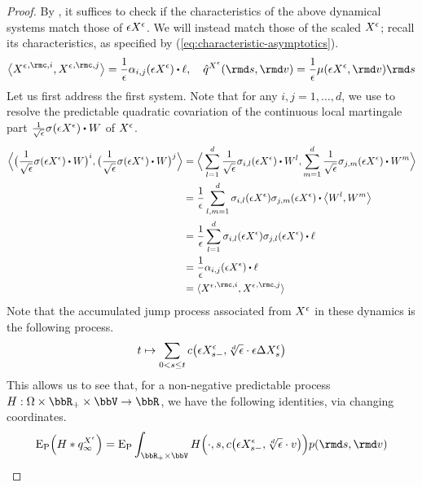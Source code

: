 \begin{proof}
  \label{proof:proposition:sde-asymptotics}
  By \cite[III.2.26]{jacod2003}, it suffices to check if the characteristics of the above dynamical systems match those of $\epsilon X^\epsilon$.
  We will instead match those of the scaled $X^\epsilon$; recall its characteristics, as specified by (\ref{eq:characteristic-asymptotics}).
  \begin{equation*}
    \bprj{{\Xee}^{,\rmc,i}}{{\Xee}^{,\rmc,j}} = \frac1\epsilon\affDiff_{i,j}(\Xe) \shortInt \leb, \quad
    \predproj{\jumpMeas^{\Xee}}(\rmd s, \rmd\markVar) = \frac1\epsilon \affJump(\Xe, \rmd\markVar) \rmd s
  \end{equation*}
  Let us first address the first system.
  Note that for any $i, j = 1, \ldots, d$, we use \cite[Theorem I.4.40(d)]{jacod2003} to resolve the predictable quadratic covariation of the continuous local martingale part $\frac{1}{\sqrt\epsilon} \affDiffSqrt(\Xe) \shortInt \W$ of $X^\epsilon$.
  \begin{align*}
    \Bprj{\big(\frac{1}{\sqrt\epsilon} \affDiffSqrt(\Xe) \shortInt\W\big)^i}{\big(\frac{1}{\sqrt\epsilon} \affDiffSqrt(\Xe) \shortInt\W\big)^j}
    &= \Bprj{\sum_{l=1}^d \frac{1}{\sqrt\epsilon} \affDiffSqrt_{i,l}(\Xe) \shortInt\W^l}{\sum_{m=1}^d \frac{1}{\sqrt\epsilon} \affDiffSqrt_{j,m}(\Xe) \shortInt\W^m} \\
    &= \frac1\epsilon\sum_{l,m=1}^d \affDiffSqrt_{i,l}(\Xe)\affDiffSqrt_{j,m}(\Xe) \shortInt \bprj{\W^l}{\W^m} \\
    &= \frac1\epsilon\sum_{l=1}^d \affDiffSqrt_{i,l}(\Xe)\affDiffSqrt_{j,l}(\Xe) \shortInt \leb \\
    &= \frac1\epsilon \affDiff_{i,j}(\Xe) \shortInt \leb \\
    &= \prj{{\Xee}^{,\rmc,i}}{{\Xee}^{,\rmc,j}}
  \end{align*}
  Note that the accumulated jump process associated from $X^\epsilon$ in these dynamics is the following process.
  \begin{equation*}
    t \mapsto \sum_{0<s\leq t} c\big(\epsilon X^\epsilon_{s-}, \sqrt[d]{\epsilon} \cdot \epsilon\Delta X^\epsilon_s \big) 
  \end{equation*}
  This allows us to see that, for a non-negative predictable process $H: \Omega \times \bbR_+ \times \vecSpace \rightarrow \bbR$, we have the following identities, via changing coordinates.
  \begin{align*}
    \Exp_\Prb\Big( H \ast \jumpMeas^{\Xee}_\infty \Big)
    &= \Exp_\Prb \int_{\bbR_+\times\vecSpace} H\Big(\cdot, s, \thinner\big(\Xe_{s-}, \sqrt[d]{\epsilon} \cdot \markVar\big) \Big) \poisRM(\rmd s, \rmd\markVar) \\

\end{align*}
\end{proof}
